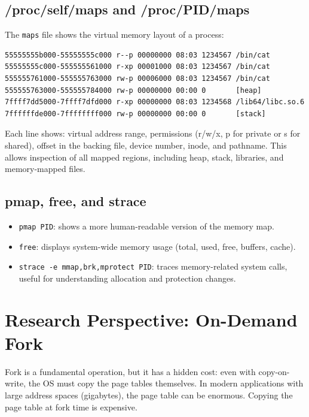 \documentclass[11pt]{article}
\begin{document}
\subsection{/proc/self/maps and /proc/PID/maps}

The \texttt{maps} file shows the virtual memory layout of a process:

\begin{lstlisting}[caption={Example /proc/self/maps output}]
55555555b000-55555555c000 r--p 00000000 08:03 1234567 /bin/cat
55555555c000-555555561000 r-xp 00001000 08:03 1234567 /bin/cat
555555761000-555555763000 rw-p 00006000 08:03 1234567 /bin/cat
555555763000-555555784000 rw-p 00000000 00:00 0       [heap]
7ffff7dd5000-7ffff7dfd000 r-xp 00000000 08:03 1234568 /lib64/libc.so.6
7ffffffde000-7ffffffff000 rw-p 00000000 00:00 0       [stack]
\end{lstlisting}

Each line shows: virtual address range, permissions (r/w/x, p for private or s for shared), offset in the backing file, device number, inode, and pathname. This allows inspection of all mapped regions, including heap, stack, libraries, and memory-mapped files.

\subsection{pmap, free, and strace}

\begin{itemize}
    \item \texttt{pmap PID}: shows a more human-readable version of the memory map.
    \item \texttt{free}: displays system-wide memory usage (total, used, free, buffers, cache).
    \item \texttt{strace -e mmap,brk,mprotect PID}: traces memory-related system calls, useful for understanding allocation and protection changes.
\end{itemize}

\section{Research Perspective: On-Demand Fork}

Fork is a fundamental operation, but it has a hidden cost: even with copy-on-write, the OS must copy the page tables themselves. In modern applications with large address spaces (gigabytes), the page table can be enormous. Copying the page table at fork time is expensive.
\end{document}
